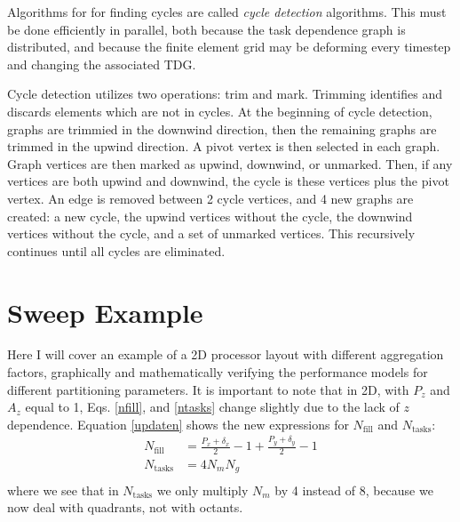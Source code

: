 \documentclass[11pt, letterpaper,titlepage,oneside]{article}
\begin{document}
Algorithms for for finding cycles are called \textit{cycle detection} algorithms. This must be done efficiently in parallel, both because the task dependence graph is distributed, and because the finite element grid may be deforming every timestep and changing the associated TDG.

Cycle detection utilizes two operations: trim and mark. Trimming identifies and discards elements which are not in cycles. At the beginning of cycle detection, graphs are trimmied in the downwind direction, then the remaining graphs are trimmed in the upwind direction. A pivot vertex is then selected in each graph. Graph vertices are then marked as upwind, downwind, or unmarked. Then, if any vertices are both upwind and downwind, the cycle is these vertices plus the pivot vertex. An edge is removed between 2 cycle vertices, and 4 new graphs are created: a new cycle, the upwind vertices without the cycle, the downwind vertices without the cycle, and a set of unmarked vertices. This recursively continues until all cycles are eliminated.

\newpage

\section*{Sweep Example}

Here I will cover an example of a 2D processor layout with different aggregation factors, graphically and mathematically verifying the performance models for different partitioning parameters. It is important to note that in 2D, with $P_z$ and $A_z$ equal to 1, Eqs. \ref{nfill}, and \ref{ntasks} change slightly due to the lack of $z$ dependence. Equation \ref{updaten} shows the new expressions for $N_{\text{fill}}$ and $N_{\text{tasks}}$:
\begin{align}
N_{\text{fill}} &= \frac{P_x + \delta_x}{2} - 1 + \frac{P_y + \delta_y}{2} - 1 \\
N_{\text{tasks}} &= 4 N_m N_g\\
\label{updaten}
\end{align}
where we see that in $N_{\text{tasks}}$ we only multiply $N_m$ by 4 instead of 8, because we now deal with quadrants, not with octants.


\end{document}
